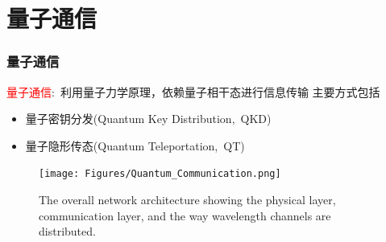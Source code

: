 \section{量子通信}
\begin{frame}
    \frametitle{量子通信}
    \textcolor{red}{量子通信}:~利用量子力学原理，依赖量子相干态进行信息传输
主要方式包括
    \begin{itemize}
	\item 量子密钥分发\textrm{(Quantum Key Distribution,~QKD)}
	\item 量子隐形传态\textrm{(Quantum Teleportation,~QT)}
    \end{itemize}
    \begin{figure}
        \centering
                \texttt{[image: Figures/Quantum\_Communication.png]}
		\caption{\tiny{\textrm{The overall network architecture showing the physical layer, communication layer, and the way wavelength channels are distributed.}}}%
		\label{Fig:Quantum_Communication}
    \end{figure}
\end{frame}

